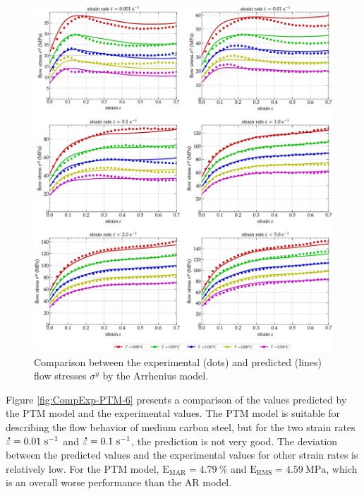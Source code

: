 \documentclass[metals,article,accept,pdftex,moreauthors]{Definitions/mdpi}
\DeclareRobustCommand{\mdot}[1]{\accentset{\mbox{\bfseries .}}{#1}}
\DeclareRobustCommand{\RMSE}{\text{E}_\text{RMS}}
\DeclareRobustCommand{\MARE}{\text{E}_\text{MAR}}
\DeclareRobustCommand{\ps}{\text{s}^{-1}}
\DeclareRobustCommand{\MPa}{\text{MPa}}
\begin{document}
\begin{figure}[H]

\includegraphics[width=0.98\columnwidth]
{Figures/CompExp-AR-6}
\caption{Comparison between the experimental (dots) and predicted (lines) flow stresses $\sigma^y$ by the Arrhenius model.}
\label{fig:CompExp-AR-6}
\end{figure}

Figure \ref{fig:CompExp-PTM-6} presents a comparison of the values predicted by the PTM model and the experimental values.
The PTM model is suitable for describing the flow behavior of medium carbon steel, but for the two strain rates $\mdot\varepsilon=0.01~\ps$ and $\mdot\varepsilon=0.1~\ps$, the prediction is not very good.
The deviation between the predicted values and the experimental values for other strain rates is relatively low.
For the PTM model, $\MARE=4.79~\%$ and $\RMSE=4.59~\MPa$, which is an overall worse performance than the AR model.
\end{document}
